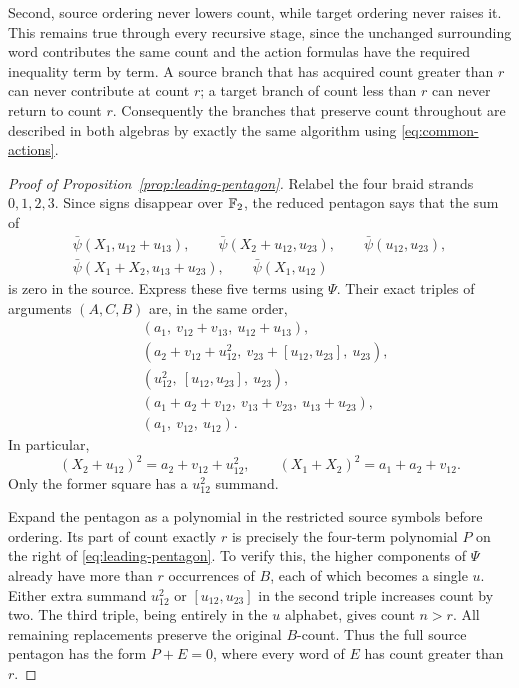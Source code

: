 Second, source ordering never lowers count, while target ordering
never raises it.  This remains true through every recursive stage,
since the unchanged surrounding word contributes the same count
and the action formulas have the required inequality term by term.
A source branch that has acquired count greater than $r$ can never
contribute at count $r$; a target branch of count less than $r$ can
never return to count $r$.  Consequently the branches that preserve
count throughout are described in both algebras by exactly the same
algorithm using \eqref{eq:common-actions}.

\begin{proof}[Proof of Proposition~\ref{prop:leading-pentagon}]
Relabel the four braid strands $0,1,2,3$.  Since signs disappear over
${\mathbb F_2}$, the reduced pentagon says that the sum of
\[
 \begin{gathered}
 \bar\psi(X_1,u_{12}+u_{13}),\qquad
 \bar\psi(X_2+u_{12},u_{23}),\qquad
 \bar\psi(u_{12},u_{23}),\\
 \bar\psi(X_1+X_2,u_{13}+u_{23}),\qquad
 \bar\psi(X_1,u_{12})
 \end{gathered}
\]
is zero in the source.  Express these five terms using $\Psi$.
Their exact triples of arguments $(A,C,B)$ are, in the same order,
\begin{equation}\label{eq:five-substitutions}
\begin{aligned}
 &(a_1,\ v_{12}+v_{13},\ u_{12}+u_{13}),\\
 &(a_2+v_{12}+u_{12}^2,\ v_{23}+[u_{12},u_{23}],\ u_{23}),\\
 &(u_{12}^2,\ [u_{12},u_{23}],\ u_{23}),\\
 &(a_1+a_2+v_{12},\ v_{13}+v_{23},\ u_{13}+u_{23}),\\
 &(a_1,\ v_{12},\ u_{12}).
\end{aligned}
\end{equation}
In particular,
\[
 (X_2+u_{12})^2=a_2+v_{12}+u_{12}^2,
 \qquad (X_1+X_2)^2=a_1+a_2+v_{12}.
\]
Only the former square has a $u_{12}^2$ summand.

Expand the pentagon as a polynomial in the restricted source symbols
before ordering.  Its part of count exactly $r$ is precisely the
four-term polynomial $P$ on the right of
\eqref{eq:leading-pentagon}.  To verify this, the higher components
of $\Psi$ already have more than $r$ occurrences of $B$, each of
which becomes a single $u$.  Either extra summand $u_{12}^2$ or
$[u_{12},u_{23}]$ in the second triple increases count by two.
The third triple, being entirely in the $u$ alphabet, gives count
$n>r$.  All remaining replacements preserve the original $B$-count.
Thus the full source pentagon has the form $P+E=0$, where every word
of $E$ has count greater than $r$.


\end{proof}
